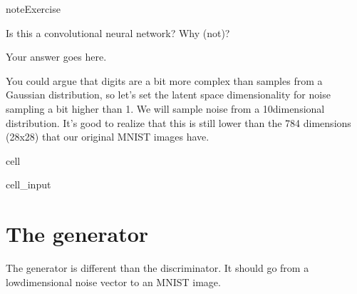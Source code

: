 \documentclass[letterpaper,10pt,english]{jupyterBook}
\begin{document}
\begin{sphinxadmonition}{note}{Exercise}

\sphinxAtStartPar
Is this a convolutional neural network? Why (not)?
\end{sphinxadmonition}

\sphinxAtStartPar
Your answer goes here.

\sphinxAtStartPar
You could argue that digits are a bit more complex than samples from a Gaussian distribution, so let’s set the latent space dimensionality for noise sampling a bit higher than 1. We will sample noise from a 10\sphinxhyphen{}dimensional distribution. It’s good to realize that this is still  lower than the 784 dimensions (28x28) that our original MNIST images have.

\begin{sphinxuseclass}{cell}\begin{sphinxVerbatimInput}

\begin{sphinxuseclass}{cell_input}
\begin{sphinxVerbatim}[commandchars=\\\{\}]
  
\end{sphinxVerbatim}

\end{sphinxuseclass}\end{sphinxVerbatimInput}

\end{sphinxuseclass}

\section{The generator}
\label{\detokenize{notebooks/Tutorial4_Generative_Models/Tutorial4_Generative_Models_student:the-generator}}
\sphinxAtStartPar
The generator is different than the discriminator. It should go from a low\sphinxhyphen{}dimensional noise vector to an MNIST image.
\end{document}
